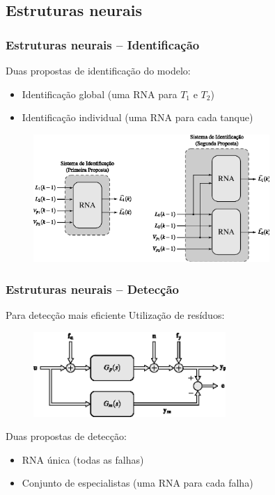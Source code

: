 \documentclass{beamer}
\begin{document}
\subsection{Estruturas neurais}
\begin{frame}
    \frametitle{Estruturas neurais -- Identificação}

    Duas propostas de identificação do modelo:

\begin{itemize}
    \item Identificação global (uma RNA para $T_1$ e $T_2$)
    \item Identificação individual (uma RNA para cada tanque)
\end{itemize}

\begin{figure}[htb]
\centering
    \includegraphics[width=0.8\textwidth]{imgs/sistema/eps/sist_ident}
\end{figure}

\end{frame}

\begin{frame}
    \frametitle{Estruturas neurais -- Detecção}

    Para detecção mais eficiente \implica Utilização de resíduos:

\begin{figure}[htb]
\centering
    \includegraphics[width=0.65\textwidth]{imgs/detec_diag/eps/residuos}
\end{figure}

    Duas propostas de detecção:

\begin{itemize}
    \item RNA única (todas as falhas)
    \item Conjunto de especialistas (uma RNA para cada falha)
\end{itemize}
    
\end{frame}
\end{document}
